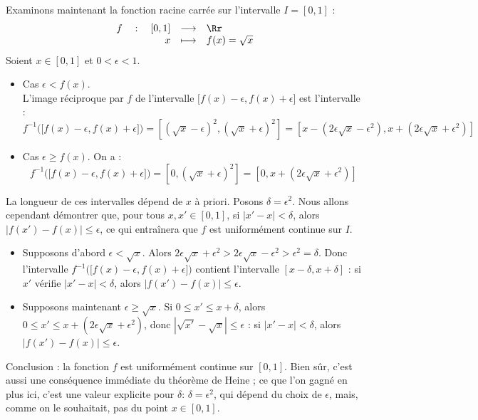 \documentclass[class=report,crop=false]{standalone}
\begin{document}
\begin{exemple}
Examinons maintenant la fonction racine carrée sur l'intervalle $I=[0,1]$ :
$$
\begin{array}{rcl}
f \quad : \quad
[0,1]&\longrightarrow&\Rr\\
x&\longmapsto&f(x)=\sqrt{x}
\end{array}
$$
Soient $x \in [0,1]$ et $0<\epsilon<1$. 
\begin{itemize}
  \item Cas $\epsilon<f(x)$. \\
  L'image réciproque par $f$ de l'intervalle $\big[f(x)-\epsilon,f(x)+\epsilon\big]$ 
  est l'intervalle :
$$f^{-1}\Big(\big[f(x)-\epsilon,f(x)+\epsilon\big]\Big)
=\left[(\sqrt{x}-\epsilon)^2,(\sqrt{x}+\epsilon)^2\right]
=\left[x-(2\epsilon\sqrt{x}-\epsilon^2),x+(2\epsilon\sqrt{x}+\epsilon^2)\right]$$
  
  
  \item Cas $\epsilon \ge f(x)$. On a :\\ 
$$ f^{-1}\Big(\big[f(x)-\epsilon,f(x)+\epsilon\big]\Big)=
\left[0,(\sqrt{x}+\epsilon)^2\right]=\left[0,x+(2\epsilon\sqrt{x}+\epsilon^2)\right]$$
\end{itemize}

La longueur de ces intervalles dépend de $x$ à priori.
Posons $\delta=\epsilon^2$. Nous allons cependant démontrer 
que, pour tous $x,x'\in
[0,1]$, si $|x'-x|<\delta$, alors $|f(x')-f(x)|\le\epsilon$, 
ce qui entraînera que $f$ est uniformément continue sur $I$. 

\begin{itemize}
  \item Supposons d'abord $\epsilon<\sqrt x$.
  Alors $2\epsilon\sqrt{x}+\epsilon^2>2\epsilon\sqrt{x}-\epsilon^2>\epsilon^2=\delta$. Donc
l'intervalle $f^{-1}\big(\big[f(x)-\epsilon,f(x)+\epsilon\big]\big)$ contient l'intervalle
$[x-\delta,x+\delta]$ : si $x'$ vérifie $|x'-x|<\delta$, alors
$|f(x')-f(x)|\le\epsilon$. 
  
  \item Supposons maintenant $\epsilon\ge \sqrt x$. 
  Si $0 \le x' \le x+\delta$, 
  alors $0\le x'\le x+(2\epsilon\sqrt{x}+\epsilon^2)$, donc $|\sqrt{x'}-\sqrt{x}|\le \epsilon$ :
  si $|x'-x|<\delta$, alors $|f(x')-f(x)|\le\epsilon$.
\end{itemize}

Conclusion : la fonction $f$ est  uniformément continue sur $[0,1]$.
Bien sûr, c'est aussi une conséquence immédiate du théorème de Heine ; ce que l'on 
gagné en plus ici, c'est une valeur explicite pour $\delta$: $\delta=\epsilon^2$,
qui dépend du choix de $\epsilon$, mais, comme on le souhaitait, pas du point $x\in[0,1]$.
 
\end{exemple}
\end{document}
